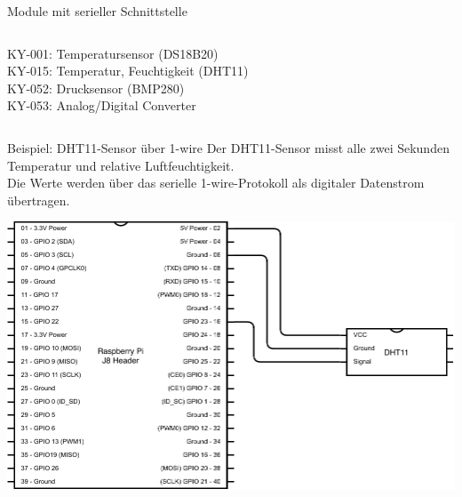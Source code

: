 {\begin{frame}{Module mit serieller Schnittstelle}
\begin{columns}
        KY-001: Temperatursensor (DS18B20) \\
        KY-015: Temperatur, Feuchtigkeit (DHT11) \\
        KY-052: Drucksensor (BMP280) \\
        KY-053: Analog/Digital Converter \\
    \end{columns}
\end{frame}
}

{
\scriptsize

\begin{frame}{Beispiel: DHT11-Sensor über 1-wire}
    Der DHT11-Sensor misst alle zwei Sekunden Temperatur und relative Luftfeuchtigkeit. \\
    Die Werte werden über das serielle 1-wire-Protokoll als digitaler Datenstrom übertragen. \\
    \medskip

    \begin{center}
        \includegraphics[width=.8\textwidth]{2-hardwaredesign/img/dht11_schaltplan}
    \end{center}
\end{frame}
}

{

    \begin{frame}[plain]
    \end{frame}
}

